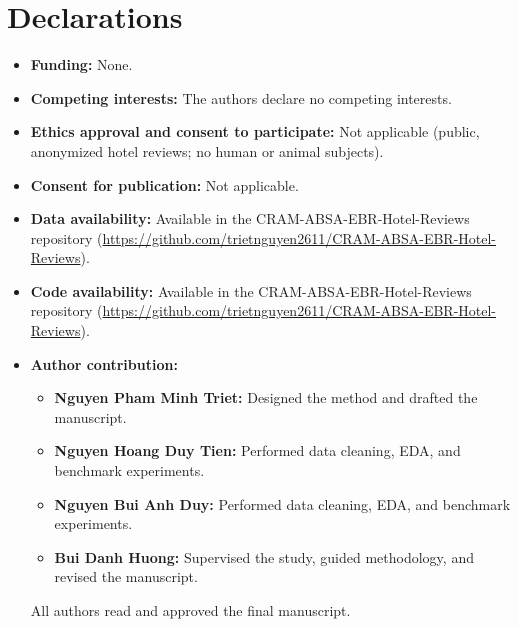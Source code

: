\documentclass[pdflatex,sn-mathphys-num]{sn-jnl}%
\theoremstyle{thmstyleone}%
\theoremstyle{thmstyletwo}%
\theoremstyle{thmstylethree}%
\begin{document}
\section*{Declarations}
\begin{itemize}[topsep=2pt, itemsep=2pt]
\item \textbf{Funding:} None.
\item \textbf{Competing interests:} The authors declare no competing interests.
\item \textbf{Ethics approval and consent to participate:} Not applicable (public, anonymized hotel reviews; no human or animal subjects).
\item \textbf{Consent for publication:} Not applicable.
\item \textbf{Data availability:} Available in the CRAM-ABSA-EBR-Hotel-Reviews repository (\url{https://github.com/trietnguyen2611/CRAM-ABSA-EBR-Hotel-Reviews}).
\item \textbf{Code availability:} Available in the CRAM-ABSA-EBR-Hotel-Reviews repository (\url{https://github.com/trietnguyen2611/CRAM-ABSA-EBR-Hotel-Reviews}).
\item \textbf{Author contribution:}
\begin{itemize}[leftmargin=1.5em, topsep=1pt, itemsep=1pt]
\item \textbf{Nguyen Pham Minh Triet:} Designed the method and drafted the manuscript.
\item \textbf{Nguyen Hoang Duy Tien:} Performed data cleaning, EDA, and benchmark experiments.
\item \textbf{Nguyen Bui Anh Duy:} Performed data cleaning, EDA, and benchmark experiments.
\item \textbf{Bui Danh Huong:} Supervised the study, guided methodology, and revised the manuscript.
\end{itemize}
\noindent All authors read and approved the final manuscript.
\end{itemize}

\clearpage
\setlength{\bibsep}{0.6em}

\end{document}
